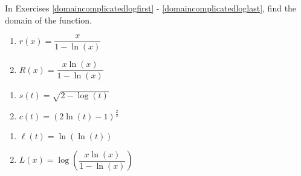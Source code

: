 \documentclass{ximera}
\begin{document}
In Exercises \ref{domaincomplicatedlogfirst} - \ref{domaincomplicatedloglast},  find the domain of the function.

\begin{multicols}{2} 
\begin{enumerate}
\setcounter{enumi}{\value{HW}}

\item \label{domaincomplicatedlogfirst}  $r(x) =   \dfrac{x}{1 - \ln(x)}$  %

\item   $R(x) = \dfrac{x \ln(x)}{1 - \ln(x)}$   %

\setcounter{HW}{\value{enumi}}
\end{enumerate}
\end{multicols}


\begin{multicols}{2} 
\begin{enumerate}
\setcounter{enumi}{\value{HW}}

\item     $s(t) = \sqrt{2 - \log(t)}$   %
\item     $c(t) =  (2 \ln(t) -1)^{\frac{2}{3}}$  %

\setcounter{HW}{\value{enumi}}
\end{enumerate}
\end{multicols}

\begin{multicols}{2} 
\begin{enumerate}
\setcounter{enumi}{\value{HW}}
  
\item     $\ell(t) = \ln( \ln(t))$   %

\item  \label{domaincomplicatedloglast}    $L(x) = \log\left( \dfrac{x \ln(x)}{1 - \ln(x)} \right)$  %


\setcounter{HW}{\value{enumi}}
\end{enumerate}
\end{multicols}
\end{document}
